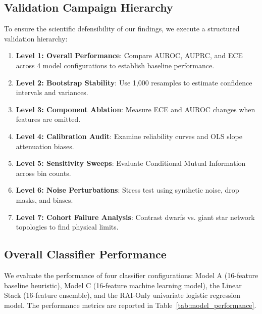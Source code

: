 \subsection{Validation Campaign Hierarchy} \label{sec:results_hierarchy}
To ensure the scientific defensibility of our findings, we execute a structured validation hierarchy:
\begin{enumerate}
\item \textbf{Level 1: Overall Performance}: Compare AUROC, AUPRC, and ECE across 4 model configurations to establish baseline performance.
\item \textbf{Level 2: Bootstrap Stability}: Use 1,000 resamples to estimate confidence intervals and variances.
\item \textbf{Level 3: Component Ablation}: Measure ECE and AUROC changes when features are omitted.
\item \textbf{Level 4: Calibration Audit}: Examine reliability curves and OLS slope attenuation biases.
\item \textbf{Level 5: Sensitivity Sweeps}: Evaluate Conditional Mutual Information across bin counts.
\item \textbf{Level 6: Noise Perturbations}: Stress test using synthetic noise, drop masks, and biases.
\item \textbf{Level 7: Cohort Failure Analysis}: Contrast dwarfs vs. giant star network topologies to find physical limits.
\end{enumerate}

\subsection{Overall Classifier Performance} \label{sec:overall_performance}
We evaluate the performance of four classifier configurations: Model A (16-feature baseline heuristic), Model C (16-feature machine learning model), the Linear Stack (16-feature ensemble), and the RAI-Only univariate logistic regression model. The performance metrics are reported in Table~\ref{tab:model_performance}.

